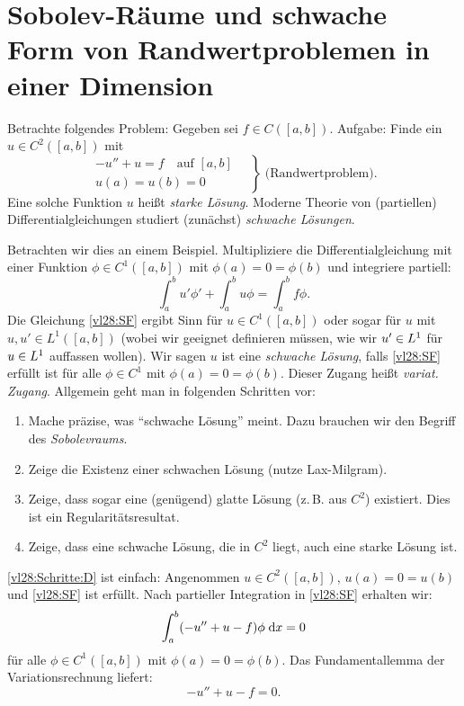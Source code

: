 \chapter{Sobolev-Räume und schwache Form
    von Randwertproblemen in einer Dimension}
\thmnoindex%
\begin{thEmpty}[Motivation] \label{vl28:motivation}
    Betrachte folgendes Problem: Gegeben sei $f\in C([a,b])$. Aufgabe:
    Finde ein $u\in C^2([a,b])$ mit
    \[ \left. \begin{gathered}
            -u''+u=f  \quad \text{auf $[a,b]$} \\
            u(a) = u(b) = 0
        \end{gathered} \quad \right\} \; \text{(Randwertproblem)}
    . \]
    Eine solche Funktion $u$ heißt \emph{starke Lösung}. Moderne Theorie von
    (partiellen) Differentialgleichungen studiert (zunächst) \emph{schwache
    Lösungen}.
    
    Betrachten wir dies an einem Beispiel. Multipliziere die
    Differentialgleichung mit einer Funktion $\phi\in C^1([a,b])$ mit
    $\phi(a)=0=\phi(b)$ und integriere partiell:
    \[ \tag{SF} \label{vl28:SF}
        \int_a^b u'\phi' + \int_a^b u\phi = \int_a^b f\phi
    . \]
    Die Gleichung \eqref{vl28:SF} ergibt Sinn für $u\in C^1([a,b])$ oder sogar
    für $u$ mit $u,u'\in L^1([a,b])$ (wobei wir geeignet definieren müssen, wie
    wir $u'\in L^{1}$ für $u\in L^{1}$ auffassen wollen). Wir sagen $u$ ist eine
    \emph{schwache Lösung}, falls \eqref{vl28:SF} erfüllt ist für alle
    $\phi\in C^1$ mit $\phi(a)=0=\phi(b)$.
    Dieser Zugang heißt \emph{variat. Zugang}. Allgemein geht man in folgenden
    Schritten vor:
    \begin{enumerate}[{{Schritt~}}A, leftmargin=*] \label{vl28:Schritte}
        \item\label{vl28:Schritte:A}
            Mache präzise, was \enquote{schwache Lösung} meint. Dazu brauchen
            wir den Begriff des \emph{Sobolevraums}.
        \item\label{vl28:Schritte:B}
            Zeige die Existenz einer schwachen Lösung (nutze Lax-Milgram).
        \item\label{vl28:Schritte:C}
            Zeige, dass sogar eine (genügend) glatte Lösung (z.\,B. aus $C^2$)
            existiert. Dies ist ein Regularitätsresultat.
        \item\label{vl28:Schritte:D}
            Zeige, dass eine schwache Lösung, die in $C^2$ liegt, auch eine
            starke Lösung ist.
    \end{enumerate}
    
    \ref{vl28:Schritte:D} ist einfach: Angenommen $u\in C^2([a,b])$,
    $u(a)=0=u(b)$ und \eqref{vl28:SF} ist erfüllt. Nach partieller Integration
    in \eqref{vl28:SF} erhalten wir:
    \[ \int_a^b (-u''+u-f) \phi \;\mathrm{d} x = 0 \]
    für alle $\phi\in C^1([a,b])$ mit $\phi(a)=0=\phi(b)$. Das Fundamentallemma
    der Variationsrechnung liefert:
    \[ -u'' + u - f = 0  . \]
\end{thEmpty}

